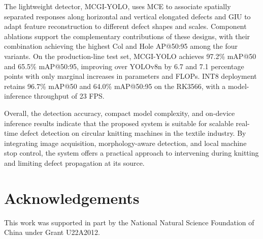 \documentclass[a4paper,fleqn]{cas-dc}
\newcommand{\model}{MCGI-YOLO\xspace}
\begin{document}
The lightweight detector, \model, uses MCE to associate spatially separated responses along horizontal and vertical elongated defects and GIU to adapt feature reconstruction to different defect shapes and scales. Component ablations support the complementary contributions of these designs, with their combination achieving the highest Col and Hole AP@50:95 among the four variants. On the production-line test set, \model achieves 97.2\% mAP@50 and 65.5\% mAP@50:95, improving over YOLOv8n by 6.7 and 7.1 percentage points with only marginal increases in parameters and FLOPs. INT8 deployment retains 96.7\% mAP@50 and 64.0\% mAP@50:95 on the RK3566, with a model-inference throughput of 23 FPS.

Overall, the detection accuracy, compact model complexity, and on-device inference results indicate that the proposed system is suitable for scalable real-time defect detection on circular knitting machines in the textile industry. By integrating image acquisition, morphology-aware detection, and local machine stop control, the system offers a practical approach to intervening during knitting and limiting defect propagation at its source.

\FloatBarrier

\section*{Acknowledgements}
This work was supported in part by the National Natural Science Foundation of China under Grant U22A2012.


\begingroup
{}
\renewcommand{\bibfont}{\fontsize{8}{9.3}\selectfont}

\endgroup
\end{document}
